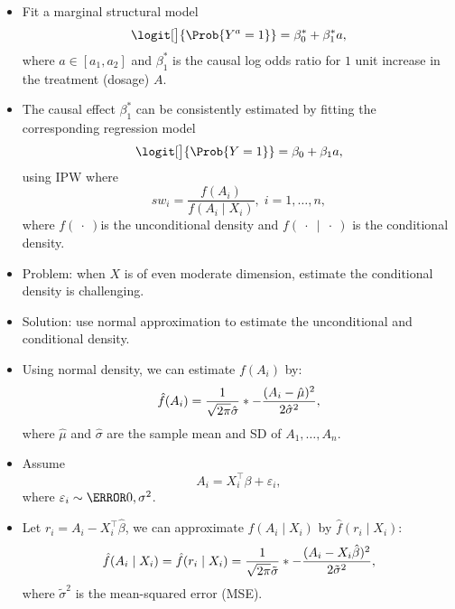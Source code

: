 \documentclass[oneside]{book}\usepackage[]{graphicx}\usepackage[svgnames]{xcolor}
\let\exp\relax%
\begin{document}
\begin{itemize}
    \item Fit a marginal structural model
          \[ \logit[\big]{\Prob{Y^a=1}}=\beta_0^*+\beta_1^*a, \]
          where $ a\in[a_1,a_2] $ and $ \beta_1^* $ is the causal log odds ratio for $1$
          unit increase in the treatment (dosage) $A$.
    \item The causal effect $ \beta_1^* $ can be consistently estimated by fitting
          the corresponding regression model
          \[ \logit[\big]{\Prob{Y=1}}=\beta_0+\beta_1a, \]
          using IPW where
          \[ sw_i=\frac{f(A_i)}{f(A_i\mid X_i)},\; i=1,\ldots,n, \]
          where $f(\:\cdot\:)$is the unconditional density and  $f(\:\cdot\:\mid\:\cdot\:)$ is the
          conditional density.
    \item Problem: when $X$ is of even moderate dimension, estimate the
          conditional density is challenging.
    \item Solution: use normal approximation to estimate the
          unconditional and conditional density.
    \item Using normal density, we can estimate $f (A_i )$ by:
          \[ \hat{f}(A_i)=\frac{1}{\sqrt{2\pi}\hat{\sigma}}\exp*{-\frac{(A_i-\hat{\mu})^2}{2\hat{\sigma}^2}}, \]
          where $ \hat{\mu} $ and $ \hat{\sigma} $ are the sample mean and SD of $ A_1,\ldots,A_n $.
    \item Assume
          \[ A_i=X_i^\top \beta+\varepsilon_i, \]
          where $ \varepsilon_i \sim \N{0,\sigma^2} $.
    \item Let $ r_i=A_i-X_i^\top \hat{\beta} $, we can approximate $ f(A_i\mid X_i) $ by $ \hat{f}(r_i\mid X_i) $:
          \[ \hat{f}(A_i\mid X_i)=\hat{f}(r_i\mid X_i)=\frac{1}{\sqrt{2\pi}\tilde{\sigma}}\exp*{-\frac{(A_i-X_i\hat{\beta})^2}{2\tilde{\sigma}^2}}, \]
          where $ \tilde{\sigma}^2 $ is the mean-squared error (MSE).
\end{itemize}
\end{document}

